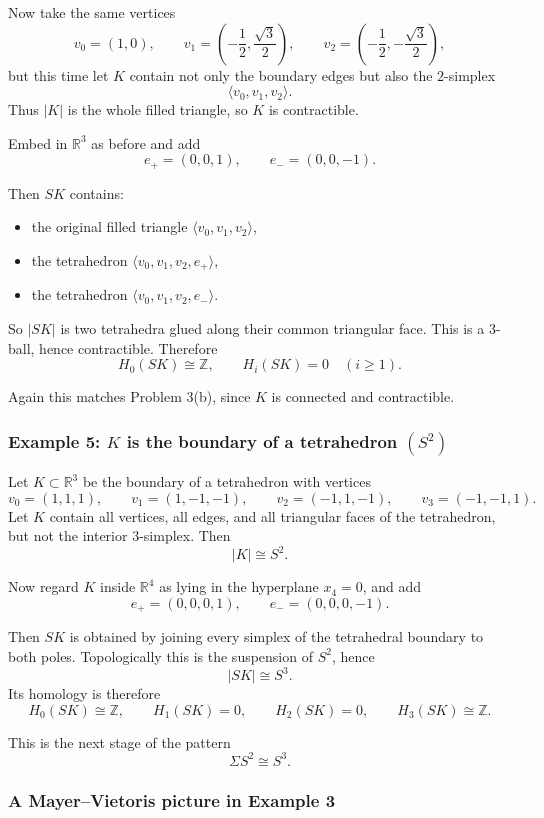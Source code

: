 \documentclass[12pt,a4paper]{article}
\theoremstyle{notespace}
\begin{document}
Now take the same vertices
\[
v_0=(1,0),\qquad
v_1=\left(-\frac12,\frac{\sqrt3}{2}\right),\qquad
v_2=\left(-\frac12,-\frac{\sqrt3}{2}\right),
\]
but this time let \(K\) contain not only the boundary edges but also the \(2\)-simplex
\[
\langle v_0,v_1,v_2\rangle.
\]
Thus \(|K|\) is the whole filled triangle, so \(K\) is contractible.

Embed in \(\mathbb R^3\) as before and add
\[
e_+=(0,0,1),
\qquad
e_-=(0,0,-1).
\]

Then \(SK\) contains:
\begin{itemize}
	\item the original filled triangle \(\langle v_0,v_1,v_2\rangle\),
	\item the tetrahedron \(\langle v_0,v_1,v_2,e_+\rangle\),
	\item the tetrahedron \(\langle v_0,v_1,v_2,e_-\rangle\).
\end{itemize}

So \(|SK|\) is two tetrahedra glued along their common triangular face. This is a \(3\)-ball, hence contractible. Therefore
\[
H_0(SK)\cong \mathbb Z,
\qquad
H_i(SK)=0\quad (i\ge 1).
\]

Again this matches Problem \(3\)(b), since \(K\) is connected and contractible.

\subsubsection*{Example 5: \(K\) is the boundary of a tetrahedron \((S^2)\)}

Let \(K\subset \mathbb R^3\) be the boundary of a tetrahedron with vertices
\[
v_0=(1,1,1),\qquad
v_1=(1,-1,-1),\qquad
v_2=(-1,1,-1),\qquad
v_3=(-1,-1,1).
\]
Let \(K\) contain all vertices, all edges, and all triangular faces of the tetrahedron, but not the interior \(3\)-simplex. Then
\[
|K|\cong S^2.
\]

Now regard \(K\) inside \(\mathbb R^4\) as lying in the hyperplane \(x_4=0\), and add
\[
e_+=(0,0,0,1),
\qquad
e_-=(0,0,0,-1).
\]

Then \(SK\) is obtained by joining every simplex of the tetrahedral boundary to both poles. Topologically this is the suspension of \(S^2\), hence
\[
|SK|\cong S^3.
\]
Its homology is therefore
\[
H_0(SK)\cong \mathbb Z,\qquad
H_1(SK)=0,\qquad
H_2(SK)=0,\qquad
H_3(SK)\cong \mathbb Z.
\]

This is the next stage of the pattern
\[
\Sigma S^2\cong S^3.
\]

\subsubsection*{A Mayer--Vietoris picture in Example 3}
\end{document}

